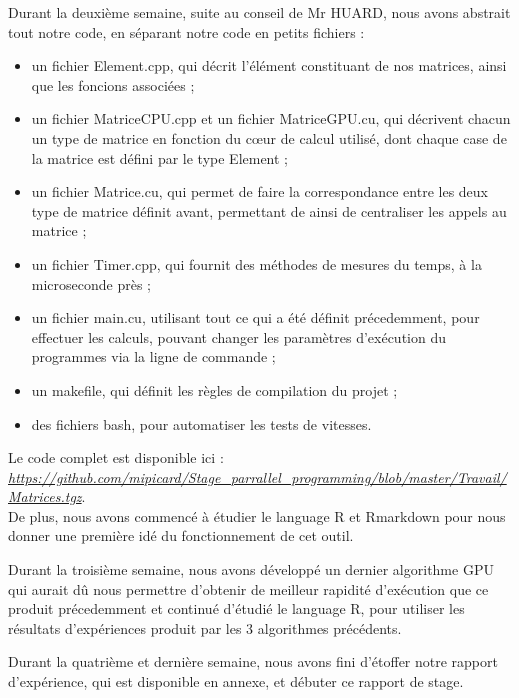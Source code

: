 \documentclass[a4paper,12pt]{article}
\begin{document}
{{	\vspace{10pt}
	\indent Durant la deuxi\`eme semaine, suite au conseil de Mr HUARD, nous avons abstrait tout notre code, en s\'e{}parant notre code en petits fichiers :
	\begin{itemize}
	    \item un fichier Element.cpp, qui d\'e{}crit l'\'e{}l\'e{}ment constituant de nos matrices, ainsi que les foncions associ\'e{}es ;
	    \item un fichier MatriceCPU.cpp et un fichier MatriceGPU.cu, qui d\'e{}crivent chacun un type de matrice en fonction du c\oe{}ur de calcul utilis\'e{}, dont chaque case de la matrice est d\'e{}fini par le type Element ;
	    \item un fichier Matrice.cu, qui permet de faire la correspondance entre les deux type de matrice d\'e{}finit avant, permettant de ainsi de centraliser les appels au matrice ;
	    \item un fichier Timer.cpp, qui fournit des m\'e{}thodes de mesures du temps, \`a la microseconde pr\`es ;
	    \item un fichier main.cu, utilisant tout ce qui a \'e{}t\'e d\'e{}finit pr\'e{}cedemment, pour effectuer les calculs, pouvant changer les param\`etres d'ex\'e{}cution du programmes via la ligne de commande ;
	    \item un makefile, qui d\'e{}finit les r\`egles de compilation du projet ;
	    \item des fichiers bash, pour automatiser les tests de vitesses.
	\end{itemize}
	Le code complet est disponible ici :  \textit{\url{https://github.com/mipicard/Stage_parrallel_programming/blob/master/Travail/Matrices.tgz}}.\\
	\indent De plus, nous avons commenc\'e \`a \'e{}tudier le language R et Rmarkdown pour nous donner une première id\'e{} du fonctionnement de cet outil.
	
	\vspace{10pt}
	\indent Durant la troisi\`eme semaine, nous avons d\'e{}velopp\'e un dernier algorithme GPU qui aurait d\^u nous permettre d'obtenir de meilleur rapidit\'e{} d'ex\'e{}cution que ce produit pr\'e{}cedemment et continu\'e{} d'\'e{}tudi\'e{} le language R, pour utiliser les r\'e{}sultats d'exp\'e{}riences produit par les 3 algorithmes pr\'e{}c\'e{}dents.
	
	\vspace{10pt}
	\indent Durant la quatri\`eme et derni\`ere semaine, nous avons fini d'\'e{}toffer notre rapport d'exp\'e{}rience, qui est disponible en annexe, et d\'e{}buter ce rapport de stage.
}}
\end{document}
